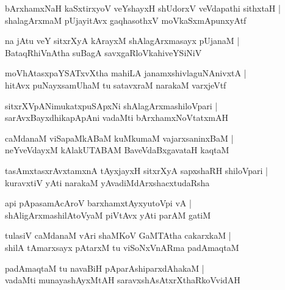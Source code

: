 \documentclass[twoside,12pt,openright]{book}
\newcounter{shloka}[chapter]
\begin{document}
\begin{shloka}%
bArxhamxNaH kaSxtirxyoV veYshayxH shUdorxV veVdapathi sithxtaH |\\
shalagArxmaM pUjayitAvx gaqhasothxV moVkaSxmApunxyAtf 
\end{shloka}

\begin{shloka}%
na jAtu veY sitxrXyA kArayxM shAlagArxmasayx pUjanaM |\\
BataqRhiVnAtha suBagA savxgaRloVkahiveYSiNiV 
\end{shloka}

\begin{shloka}%
moVhAtasxpaYSATxvXtha mahiLA janamxshivlaguNAnivxtA |\\
hitAvx puNayxsamUhaM tu satavxraM narakaM varxjeVtf 
\end{shloka}

\begin{shloka}%
sitxrXVpANimukatxpuSApxNi shAlagArxmashiloVpari |\\
sarAvxBayxdhikapApAni vadaMti bArxhamxNoVtatxmAH
\end{shloka}

\begin{shloka}%
caMdanaM viSapaMkABaM kuMkumaM vajarxsaninxBaM |\\
neYveVdayxM kAlakUTABAM BaveVdaBxgavataH kaqtaM 
\end{shloka}

\begin{shloka}%
tasAmxtasxrAvxtamxnA tAyxjayxH sitxrXyA sapxshaRH shiloVpari |\\
kuravxtiV yAti narakaM yAvadiMdArxshacxtudaRsha
\end{shloka}

\begin{shloka}%
api pApasamAcAroV barxhamxtAyxyutoVpi vA |\\
shAligArxmashilAtoVyaM piVtAvx yAti parAM gatiM 
\end{shloka}

\begin{shloka}%
tulasiV caMdanaM vAri shaMKoV GaMTAtha cakarxkaM |\\
shilA tAmarxsayx pAtarxM tu viSoNxVnARma padAmaqtaM 
\end{shloka}

\begin{shloka}%
padAmaqtaM tu navaBiH pAparAshiparxdAhakaM |\\
vadaMti munayashAyxMtAH saravxshAsAtxrXthaRkoVvidAH
\end{shloka}
\end{document}
